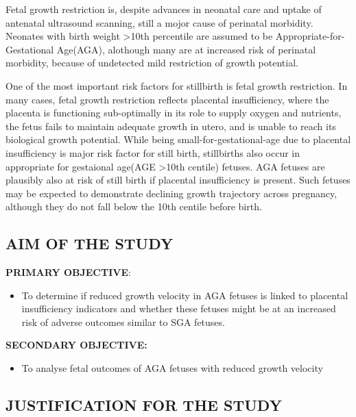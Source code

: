 \documentclass[14pt]{extarticle}
\begin{document}
\newpage
\justifying

Fetal growth restriction is, despite advances in neonatal care and uptake of antenatal ultrasound scanning, still a mojor cause of perinatal morbidity. Neonates with birth weight \textgreater10th percentile are assumed to be Appropriate-for-Gestational Age(AGA), alothough many are at increased risk of perinatal morbidity, because of undetected mild restriction of growth potential.

One of the most important risk factors for stillbirth is fetal growth restriction. In many cases, fetal growth restriction reflects placental insufficiency, where the placenta is functioning sub-optimally in its role to supply oxygen and nutrients, the fetus fails to maintain adequate growth in utero, and is unable to reach its biological growth potential. While being small-for-gestational-age due to placental insufficiency is major risk factor for still birth, stillbirths also occur in appropriate for gestaional age(AGE \textgreater10th centile) fetuses. AGA fetuses are plausibly also at risk of still birth if placental insufficiency is present. Such fetuses may be expected to demonstrate declining growth trajectory across pregnancy, although they do not fall below the 10th centile before birth.

\newpage
\null
\vfill
\begin{flushright}
    \section{AIM OF THE STUDY}
\end{flushright}
\hrulefill
\newpage

\textbf{PRIMARY OBJECTIVE}:

\begin{itemize}
    \item To determine if reduced growth velocity in AGA fetuses is linked to placental insufficiency indicators and whether these fetuses might be at an increased risk of adverse outcomes similar to SGA fetuses.
\end{itemize}

\textbf{SECONDARY OBJECTIVE:}

\begin{itemize}
    \item To analyse fetal outcomes of AGA fetuses with reduced growth velocity
\end{itemize}

\newpage
\null
\vfill
\begin{flushright}
    \section{JUSTIFICATION FOR THE STUDY}
\end{flushright}
\hrulefill
\newpage
\end{document}
